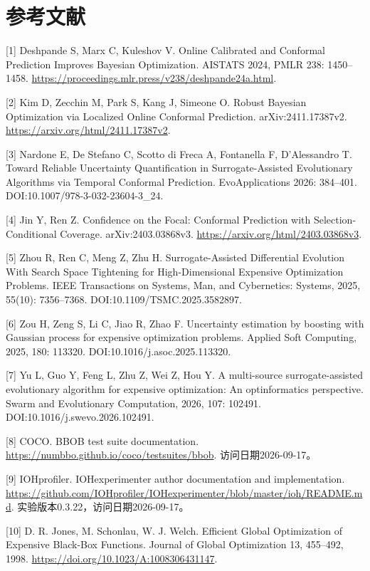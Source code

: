 \documentclass[11pt,a4paper]{article}
\begin{document}
\hypertarget{ux53c2ux8003ux6587ux732e}{%
\section{参考文献}\label{ux53c2ux8003ux6587ux732e}}

{[}1{]} Deshpande S, Marx C, Kuleshov V. Online Calibrated and Conformal
Prediction Improves Bayesian Optimization. AISTATS 2024, PMLR 238:
1450--1458. \url{https://proceedings.mlr.press/v238/deshpande24a.html}.

{[}2{]} Kim D, Zecchin M, Park S, Kang J, Simeone O. Robust Bayesian
Optimization via Localized Online Conformal Prediction.
arXiv:2411.17387v2. \url{https://arxiv.org/html/2411.17387v2}.

{[}3{]} Nardone E, De Stefano C, Scotto di Freca A, Fontanella F,
D'Alessandro T. Toward Reliable Uncertainty Quantification in
Surrogate-Assisted Evolutionary Algorithms via Temporal Conformal
Prediction. EvoApplications 2026: 384--401.
DOI:10.1007/978-3-032-23604-3\_24.

{[}4{]} Jin Y, Ren Z. Confidence on the Focal: Conformal Prediction with
Selection-Conditional Coverage. arXiv:2403.03868v3.
\url{https://arxiv.org/html/2403.03868v3}.

{[}5{]} Zhou R, Ren C, Meng Z, Zhu H. Surrogate-Assisted Differential
Evolution With Search Space Tightening for High-Dimensional Expensive
Optimization Problems. IEEE Transactions on Systems, Man, and
Cybernetics: Systems, 2025, 55(10): 7356--7368.
DOI:10.1109/TSMC.2025.3582897.

{[}6{]} Zou H, Zeng S, Li C, Jiao R, Zhao F. Uncertainty estimation by
boosting with Gaussian process for expensive optimization problems.
Applied Soft Computing, 2025, 180: 113320.
DOI:10.1016/j.asoc.2025.113320.

{[}7{]} Yu L, Guo Y, Feng L, Zhu Z, Wei Z, Hou Y. A multi-source
surrogate-assisted evolutionary algorithm for expensive optimization: An
optinformatics perspective. Swarm and Evolutionary Computation, 2026,
107: 102491. DOI:10.1016/j.swevo.2026.102491.

{[}8{]} COCO. BBOB test suite documentation.
\url{https://numbbo.github.io/coco/testsuites/bbob}.
访问日期2026-09-17。

{[}9{]} IOHprofiler. IOHexperimenter author documentation and
implementation.
\url{https://github.com/IOHprofiler/IOHexperimenter/blob/master/ioh/README.md}.
实验版本0.3.22，访问日期2026-09-17。

{[}10{]} D. R. Jones, M. Schonlau, W. J. Welch. Efficient Global
Optimization of Expensive Black-Box Functions. Journal of Global
Optimization 13, 455--492, 1998.
\url{https://doi.org/10.1023/A:1008306431147}.
\end{document}
